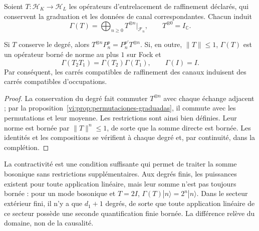 Soient \(T:\mathcal H_K\to\mathcal H_L\) les opérateurs d’entrelacement
de raffinement déclarés, qui conservent la graduation et les
données de canal correspondantes. Chacun induit
\begin{equation}
 \Gamma(T)=\bigoplus_{n\ge0}T^{\otimes n}|_{\mathcal F_n},
 \qquad T^{\otimes0}=I_{\mathbb C}.
 \label{vi:eq:segunda-cuantizacion-transporte}
\end{equation}

\begin{theorem}
\label{vi:thm:fock-naturalidad}
Si \(T\) conserve le degré, alors
\(T^{\otimes n}P_n^p=P_n^{p'}T^{\otimes n}\).
Si, en outre, \(\|T\|\le1\), \(\Gamma(T)\) est un opérateur
borné de norme au plus \(1\) sur Fock et
\[
 \Gamma(T_2T_1)=\Gamma(T_2)\Gamma(T_1),\qquad
 \Gamma(I)=I.
\]
Par conséquent, les carrés compatibles de raffinement
des canaux induisent des carrés compatibles d’occupations.
\end{theorem}
\begin{proof}
La conservation du degré fait commuter \(T^{\otimes n}\)
avec chaque échange adjacent ; par la
proposition~\ref{vi:prop:permutaciones-graduadas}, il commute
avec les permutations et leur moyenne. Les restrictions
sont ainsi bien définies. Leur norme est bornée par
\(\|T\|^n\le1\), de sorte que la somme directe est bornée.
Les identités et les compositions se vérifient à chaque degré
et, par continuité, dans la complétion.
\end{proof}

La contractivité est une condition suffisante qui permet de traiter
la somme bosonique sans restrictions supplémentaires. Aux degrés finis,
les puissances existent pour toute application linéaire, mais leur
somme n’est pas toujours bornée : pour un mode bosonique et \(T=2I\),
\(\Gamma(T)|n\rangle=2^n|n\rangle\). Dans le secteur extérieur
fini, il n’y a que \(d_1+1\) degrés, de sorte que toute
application linéaire de ce secteur possède une seconde quantification
finie bornée. La différence relève du domaine, non de la causalité.

